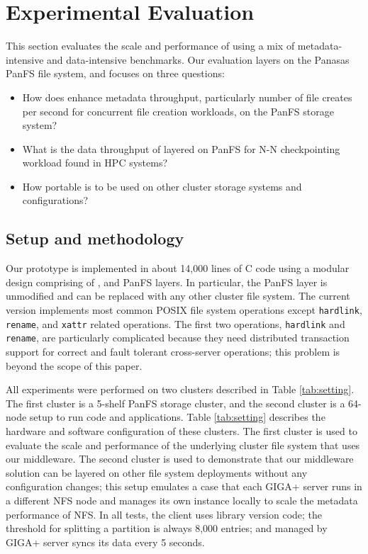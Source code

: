 \section{Experimental Evaluation}

This section evaluates the scale and performance of \sys using a mix of
metadata-intensive and data-intensive benchmarks. Our evaluation layers \sys on
the Panasas PanFS file system, and focuses on three questions:
\begin{itemize}
\item How does \sys enhance metadata throughput, particularly
number of file creates per second for concurrent file creation workloads, on
the PanFS storage system?
\item What is the data throughput of \sys layered on PanFS for N-N checkpointing 
workload found in HPC systems?
\item How portable is \sys to be used on other cluster storage systems and
configurations?
\end{itemize}

\subsection{Setup and methodology}

Our prototype is implemented in about 14,000 lines of C code using
a modular design comprising of \tfs, \ldb and PanFS layers. In particular, the
PanFS layer is unmodified and can be replaced with any other cluster file
system. The current version implements most common POSIX file system operations 
except \texttt{hardlink}, \texttt{rename}, and \texttt{xattr} related operations.
The first two operations, \texttt{hardlink} and \texttt{rename}, are
particularly complicated because they need distributed transaction support for
correct and fault tolerant cross-server operations; this problem is beyond the
scope of this paper.

All experiments were performed on two clusters described in Table
\ref{tab:setting}. The first cluster is a 5-shelf PanFS storage cluster, and the 
second cluster is a 64-node setup to run \sys code and applications.
Table \ref{tab:setting} describes the hardware and software configuration of
these clusters.
The first cluster is used to evaluate the scale and performance of the
underlying cluster file system that uses our middleware.
The second cluster is used to demonstrate that our middleware 
solution can be layered on other file system deployments without any
configuration changes; this setup
emulates a case that each GIGA+ server runs in a different NFS node and manages 
its own \tfs instance locally to scale the metadata performance of NFS.
In all tests, the client uses library version code;
the threshold for splitting a partition is always 8,000 entries;
and \tfs managed by GIGA+ server syncs its data every 5 seconds.


